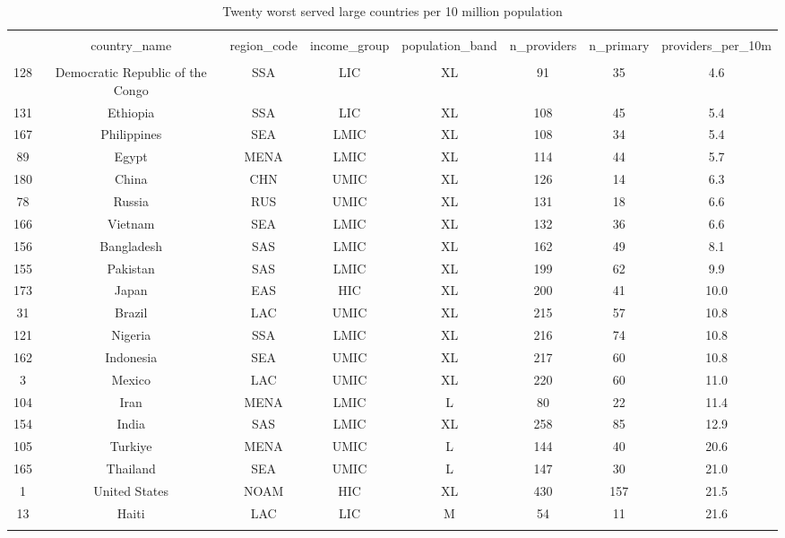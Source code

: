 
\begin{table}[!htbp] \centering 
  \caption{Twenty worst served large countries per 10 million population} 
  \label{} 
\begin{tabular}{@{\extracolsep{5pt}} cccccccc} 
\\[-1.8ex]\hline 
\hline \\[-1.8ex] 
 & country\_name & region\_code & income\_group & population\_band & n\_providers & n\_primary & providers\_per\_10m \\ 
\hline \\[-1.8ex] 
128 & Democratic Republic of the Congo & SSA & LIC & XL &  91 &  35 &  4.6 \\ 
131 & Ethiopia & SSA & LIC & XL & 108 &  45 &  5.4 \\ 
167 & Philippines & SEA & LMIC & XL & 108 &  34 &  5.4 \\ 
89 & Egypt & MENA & LMIC & XL & 114 &  44 &  5.7 \\ 
180 & China & CHN & UMIC & XL & 126 &  14 &  6.3 \\ 
78 & Russia & RUS & UMIC & XL & 131 &  18 &  6.6 \\ 
166 & Vietnam & SEA & LMIC & XL & 132 &  36 &  6.6 \\ 
156 & Bangladesh & SAS & LMIC & XL & 162 &  49 &  8.1 \\ 
155 & Pakistan & SAS & LMIC & XL & 199 &  62 &  9.9 \\ 
173 & Japan & EAS & HIC & XL & 200 &  41 & 10.0 \\ 
31 & Brazil & LAC & UMIC & XL & 215 &  57 & 10.8 \\ 
121 & Nigeria & SSA & LMIC & XL & 216 &  74 & 10.8 \\ 
162 & Indonesia & SEA & UMIC & XL & 217 &  60 & 10.8 \\ 
3 & Mexico & LAC & UMIC & XL & 220 &  60 & 11.0 \\ 
104 & Iran & MENA & LMIC & L &  80 &  22 & 11.4 \\ 
154 & India & SAS & LMIC & XL & 258 &  85 & 12.9 \\ 
105 & Turkiye & MENA & UMIC & L & 144 &  40 & 20.6 \\ 
165 & Thailand & SEA & UMIC & L & 147 &  30 & 21.0 \\ 
1 & United States & NOAM & HIC & XL & 430 & 157 & 21.5 \\ 
13 & Haiti & LAC & LIC & M &  54 &  11 & 21.6 \\ 
\hline \\[-1.8ex] 
\end{tabular} 
\end{table} 
